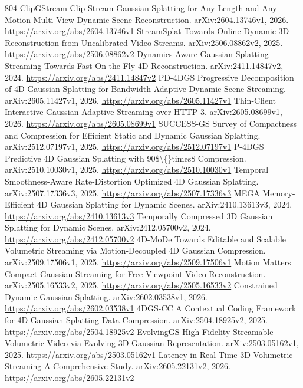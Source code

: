 \documentclass[11pt]{article}
\begin{document}
\begin{thebibliography}{804}
 ClipGStream Clip-Stream Gaussian Splatting for Any Length and Any Motion Multi-View Dynamic Scene Reconstruction. arXiv:2604.13746v1, 2026. \url{https://arxiv.org/abs/2604.13746v1}
 StreamSplat Towards Online Dynamic 3D Reconstruction from Uncalibrated Video Streams. arXiv:2506.08862v2, 2025. \url{https://arxiv.org/abs/2506.08862v2}
 Dynamics-Aware Gaussian Splatting Streaming Towards Fast On-the-Fly 4D Reconstruction. arXiv:2411.14847v2, 2024. \url{https://arxiv.org/abs/2411.14847v2}
 PD-4DGS Progressive Decomposition of 4D Gaussian Splatting for Bandwidth-Adaptive Dynamic Scene Streaming. arXiv:2605.11427v1, 2026. \url{https://arxiv.org/abs/2605.11427v1}
 Thin-Client Interactive Gaussian Adaptive Streaming over HTTP 3. arXiv:2605.08699v1, 2026. \url{https://arxiv.org/abs/2605.08699v1}
 SUCCESS-GS Survey of Compactness and Compression for Efficient Static and Dynamic Gaussian Splatting. arXiv:2512.07197v1, 2025. \url{https://arxiv.org/abs/2512.07197v1}
 P-4DGS Predictive 4D Gaussian Splatting with 90\$\textbackslash\{\}times\$ Compression. arXiv:2510.10030v1, 2025. \url{https://arxiv.org/abs/2510.10030v1}
 Temporal Smoothness-Aware Rate-Distortion Optimized 4D Gaussian Splatting. arXiv:2507.17336v3, 2025. \url{https://arxiv.org/abs/2507.17336v3}
 MEGA Memory-Efficient 4D Gaussian Splatting for Dynamic Scenes. arXiv:2410.13613v3, 2024. \url{https://arxiv.org/abs/2410.13613v3}
 Temporally Compressed 3D Gaussian Splatting for Dynamic Scenes. arXiv:2412.05700v2, 2024. \url{https://arxiv.org/abs/2412.05700v2}
 4D-MoDe Towards Editable and Scalable Volumetric Streaming via Motion-Decoupled 4D Gaussian Compression. arXiv:2509.17506v1, 2025. \url{https://arxiv.org/abs/2509.17506v1}
 Motion Matters Compact Gaussian Streaming for Free-Viewpoint Video Reconstruction. arXiv:2505.16533v2, 2025. \url{https://arxiv.org/abs/2505.16533v2}
 Constrained Dynamic Gaussian Splatting. arXiv:2602.03538v1, 2026. \url{https://arxiv.org/abs/2602.03538v1}
 4DGS-CC A Contextual Coding Framework for 4D Gaussian Splatting Data Compression. arXiv:2504.18925v2, 2025. \url{https://arxiv.org/abs/2504.18925v2}
 EvolvingGS High-Fidelity Streamable Volumetric Video via Evolving 3D Gaussian Representation. arXiv:2503.05162v1, 2025. \url{https://arxiv.org/abs/2503.05162v1}
 Latency in Real-Time 3D Volumetric Streaming A Comprehensive Study. arXiv:2605.22131v2, 2026. \url{https://arxiv.org/abs/2605.22131v2}

\end{thebibliography}
\end{document}
